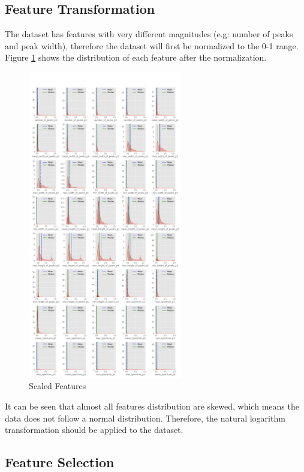 \documentclass[11pt]{article}
\begin{document}
\hypertarget{feature-transformation}{%
\subsection{Feature Transformation}\label{feature-transformation}}

The dataset has features with very different magnitudes (e.g: number of
peaks and peak width), therefore the dataset will first be normalized to
the 0-1 range. Figure \ref{fig:pdsignal_scaledfeat} shows the distribution of each feature
after the normalization.


\begin{figure}[h]
\centering
\includegraphics[width=0.6\textwidth]{dist_minmax_scaled.png}
\caption{Scaled Features}
\label{fig:pdsignal_scaledfeat}
\end{figure}


It can be seen that almost all features distribution are skewed, which
means the data does not follow a normal distribution. Therefore, the
natural logarithm transformation should be applied to the dataset.

\hypertarget{feature-selection}{%
\subsection{Feature Selection}\label{feature-selection}}
\end{document}

